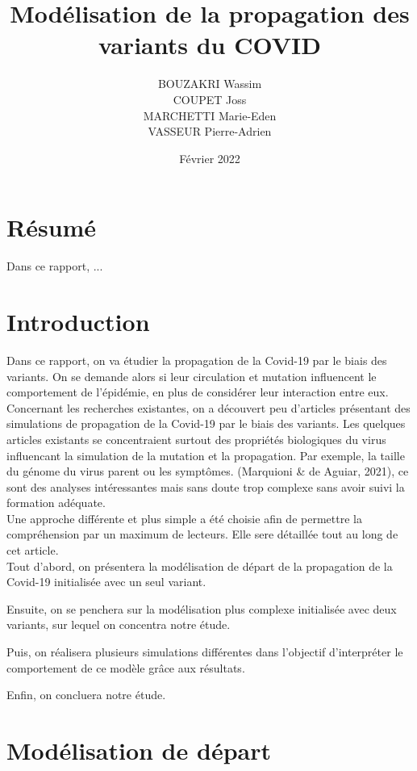 \documentclass{article}
\title{Modélisation de la propagation des variants du COVID}
\author{BOUZAKRI Wassim \\COUPET Joss \\MARCHETTI Marie-Eden \\VASSEUR Pierre-Adrien}
\date{Février 2022}
\begin{document}
\maketitle

\section{Résumé}

Dans ce rapport, ...

\section{Introduction}

Dans ce rapport, on va étudier la propagation de la Covid-19 par le biais des variants.
On se demande alors si leur circulation et mutation influencent le comportement de l'épidémie, en plus de considérer leur interaction entre eux.\\

\noindent
Concernant les recherches existantes, on a découvert peu d'articles présentant des simulations de propagation de la Covid-19 par le biais des variants.
Les quelques articles existants se concentraient surtout des propriétés biologiques du virus influencant la simulation de la mutation et la propagation.
Par exemple, la taille du génome du virus parent ou les symptômes. (Marquioni \& de Aguiar, 2021), ce sont des analyses intéressantes mais sans doute trop complexe sans avoir suivi la formation adéquate.\\

\noindent
Une approche différente et plus simple a été choisie afin de permettre la compréhension par un maximum de lecteurs. Elle sere détaillée tout au long de cet article.\\

\noindent
Tout d'abord, on présentera la modélisation de départ de la propagation de la Covid-19 initialisée avec un seul variant. \par
Ensuite, on se penchera sur la modélisation plus complexe initialisée avec deux variants, sur lequel on concentra notre étude.\par
Puis, on réalisera plusieurs simulations différentes dans l'objectif d'interpréter le comportement de ce modèle grâce aux résultats.\par
Enfin, on concluera notre étude.\\

\section{Modélisation de départ}
\end{document}
